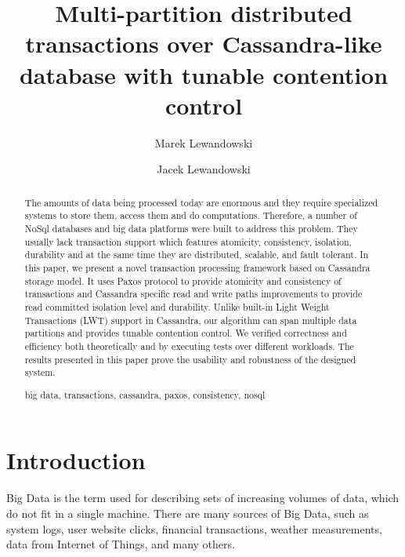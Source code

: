 \documentclass[runningheads,a4paper]{llncs}
\newcommand{\keywords}[1]{\par\addvspace\baselineskip
\noindent\keywordname\enspace\ignorespaces#1}
\begin{document}
\mainmatter

\title{Multi-partition distributed transactions over Cassandra-like database with tunable contention control}

\author{Marek Lewandowski \and Jacek Lewandowski}


\maketitle

\begin{abstract} The amounts of data being processed today are enormous and they
require specialized systems  to store them, access them and do computations.
Therefore, a number of NoSql databases and  big data platforms were built to
address this problem. They usually lack transaction support which features
atomicity, consistency, isolation, durability and at the same time  they are
distributed, scalable, and fault tolerant. In this paper, we present a novel
transaction processing framework based on Cassandra storage model. It uses Paxos
protocol  to provide atomicity and consistency of transactions and Cassandra
specific read and write  paths improvements to provide read committed isolation
level and durability. Unlike built-in  Light Weight Transactions (LWT) support
in Cassandra, our algorithm can span multiple data  partitions and provides
tunable contention control. We verified correctness and efficiency  both
theoretically and by executing tests over different workloads. The results
presented  in this paper prove the usability and robustness of the designed
system.  \keywords{big data, transactions, cassandra, paxos, consistency, nosql}
\end{abstract}

\section{Introduction} Big Data is the term used for describing sets of
increasing volumes of data, which do not fit  in a single machine. There are
many sources of Big Data, such as system logs, user website  clicks, financial
transactions, weather measurements, data from Internet of Things, and many
others.
\end{document}
